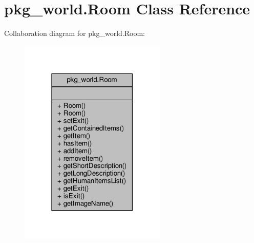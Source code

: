 \hypertarget{classpkg__world_1_1Room}{\section{pkg\-\_\-world.\-Room Class Reference}
\label{classpkg__world_1_1Room}
}


Collaboration diagram for pkg\-\_\-world.\-Room\-:
\nopagebreak
\begin{figure}[H]
\begin{center}
\leavevmode
\includegraphics[width=198pt]{classpkg__world_1_1Room__coll__graph}
\end{center}
\end{figure}
